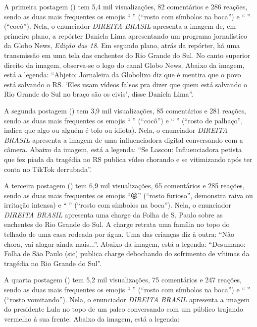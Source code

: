 \documentclass[portuguese]{textolivre}
\begin{document}
A primeira postagem () tem 5,4 mil visualizações, 82 comentários e 286 reações, sendo as duas mais frequentes os emojis ``{\Symbola 🤬}'' (``rosto com símbolos na boca'') e ``{\Symbola 💩}'' (``cocô''). Nela, o enunciador \emph{DIREITA BRASIL} apresenta a imagem de, em primeiro plano, a repórter Daniela Lima apresentando um programa jornalístico da Globo News, \emph{Edição das 18}. Em segundo plano, atrás da repórter, há uma transmissão em uma tela das enchentes do Rio Grande do Sul. No canto superior direito da imagem, observa-se o logo do canal Globo News. Abaixo da imagem, está a legenda: ``Abjeto: Jornaleira da Globolixo diz que é mentira que o povo está salvando o RS. `Eles usam vídeos falsos pra dizer que quem está salvando o Rio Grande do Sul no braço são os civis', disse Daniela Lima''.

A segunda postagem () tem 3,9 mil visualizações, 85 comentários e 281 reações, sendo as duas mais frequentes os emojis ``{\Symbola 💩}'' (``cocô'') e ``{\Symbola 🤡}'' (``rosto de palhaço'', indica que algo ou alguém é tolo ou idiota). Nela, o enunciador \emph{DIREITA BRASIL} apresenta a imagem de uma influenciadora digital conversando com a câmera. Abaixo da imagem, está a legenda: ``Se Lascou: Influenciadora petista que fez piada da tragédia no RS publica vídeo chorando e se vitimizando após ter conta no TikTok derrubada''.

A terceira postagem () tem 6,9 mil visualizações, 65 comentários e 285 reações, sendo as duas mais frequentes os emojis ``{\Symbola 😡}'' (``rosto furioso'', demonstra raiva ou irritação intensa) e ``{\Symbola 🤬}'' (``rosto com símbolos na boca''). Nela, o enunciador \emph{DIREITA BRASIL} apresenta uma charge da Folha de S. Paulo sobre as enchentes do Rio Grande do Sul. A charge retrata uma família no topo do telhado de uma casa rodeada por água. Uma das crianças diz à outra: ``Não chora, vai alagar ainda mais...''. Abaixo da imagem, está a legenda: ``Desumano: Folha de São Paulo (sic) publica charge debochando do sofrimento de vítimas da tragédia no Rio Grande do Sul''.

A quarta postagem () tem 5,2 mil visualizações, 75 comentários e 247 reações, sendo as duas mais frequentes os emojis ``{\Symbola 🤬}'' (``rosto com símbolos na boca'') e ``{\Symbola 🤮}'' (``rosto vomitando''). Nela, o enunciador \emph{DIREITA BRASIL} apresenta a imagem do presidente Lula no topo de um palco conversando com um público trajando vermelho à sua frente. Abaixo da imagem, está a legenda:
\end{document}
